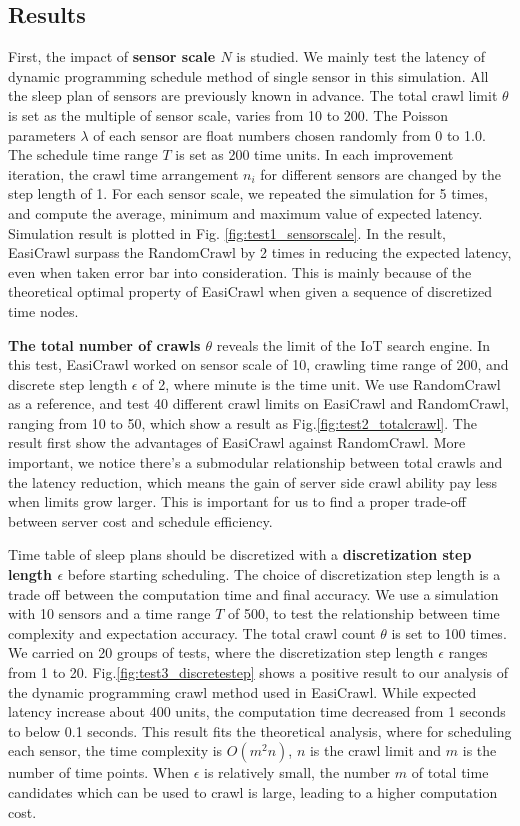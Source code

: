 \documentclass[conference]{IEEEtran}
\begin{document}
\subsection{Results}

First, the impact of \textbf{sensor scale $N$} is studied.
We mainly test the latency of dynamic programming schedule method of single sensor in this simulation. 
All the sleep plan of sensors are previously known in advance.
The total crawl limit $\theta$ is set as the multiple of sensor scale, varies from 10 to 200. 
The Poisson parameters $\lambda$ of each sensor are float numbers chosen randomly from 0 to 1.0. 
The schedule time range $T$ is set as 200 time units. 
In each improvement iteration, the crawl time arrangement $n_i$ for different sensors are changed by the step length of 1. 
For each sensor scale, we repeated the simulation for 5 times, and compute the average, minimum and maximum value of expected latency. 
Simulation result is plotted in Fig. \ref{fig:test1_sensorscale}.
In the result, EasiCrawl surpass the RandomCrawl by 2 times in reducing the expected latency, even when taken error bar into consideration. 
This is mainly because of the theoretical optimal property of EasiCrawl when given a sequence of discretized time nodes. 

\textbf{The total number of crawls $\theta$} reveals the limit of the IoT search engine.
In this test, EasiCrawl worked on sensor scale of 10, crawling time range of 200, and discrete step length $\epsilon$ of 2, where minute is the time unit.
We use RandomCrawl as a reference, and test 40 different crawl limits on EasiCrawl and RandomCrawl, ranging from 10 to 50, which show a result as Fig.\ref{fig:test2_totalcrawl}.
The result first show the advantages of EasiCrawl against RandomCrawl. 
More important, we notice there's a submodular relationship between total crawls and the latency reduction, which means the gain of server side crawl ability pay less when limits grow larger. 
This is important for us to find a proper trade-off between server cost and schedule efficiency.

Time table of sleep plans should be discretized with a \textbf{discretization step length $\epsilon$} before starting scheduling. 
The choice of discretization step length is a trade off between the computation time and final accuracy. 
We use a simulation with 10 sensors and a time range $T$ of 500, to test the relationship between time complexity and expectation accuracy. 
The total crawl count $\theta$ is set to 100 times.
We carried on 20 groups of tests, where the discretization step length $\epsilon$ ranges from 1 to 20.
Fig.\ref{fig:test3_discretestep} shows a positive result to our analysis of the dynamic programming crawl method used in EasiCrawl. 
While expected latency increase about 400 units, the computation time decreased from 1 seconds to below 0.1 seconds. 
This result fits the theoretical analysis, where for scheduling each sensor, the time complexity is $O(m^{2}n)$, $n$ is the crawl limit and $m$ is the number of time points.
When $\epsilon$ is relatively small, the number $m$ of total time candidates which can be used to crawl is large, leading to a higher computation cost.
\end{document}
